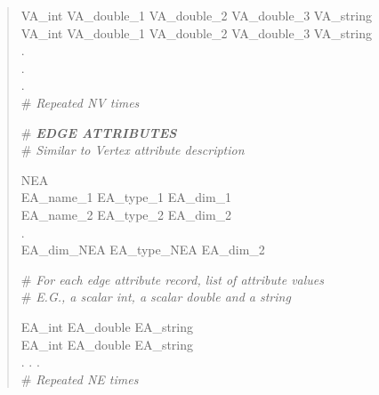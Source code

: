 \documentclass[12pt]{article}
\begin{document}
\begin{verse}
VA\_int \hspace{0.5ex} VA\_double\_1 \hspace{0.5ex} VA\_double\_2 \hspace{0.5ex} VA\_double\_3 \hspace{0.5ex} VA\_string \\
VA\_int \hspace{0.5ex} VA\_double\_1 \hspace{0.5ex} VA\_double\_2 \hspace{0.5ex} VA\_double\_3 \hspace{0.5ex} VA\_string \\
. \\
. \\
. \\
\# \textit{Repeated NV times}
\vspace{2ex}

\newpage
\# \textit{\textbf{EDGE ATTRIBUTES}} \\
\# \textit{Similar to Vertex attribute description}
\vspace{1ex}

NEA \hspace{0.5ex} \\
EA\_name\_1 \hspace{0.5ex} EA\_type\_1 \hspace{0.5ex} EA\_dim\_1 \\ 
EA\_name\_2 \hspace{0.5ex} EA\_type\_2 \hspace{0.5ex} EA\_dim\_2 \\
. \\
EA\_dim\_NEA \hspace{0.5ex} EA\_type\_NEA \hspace{0.5ex} EA\_dim\_2  
\vspace{1ex}

\# \textit{For each edge attribute record, list of attribute values} \\
\# \textit{E.G., a scalar int, a scalar double and a string}
\vspace{1ex}

EA\_int \hspace{0.5ex} EA\_double \hspace{0.5ex} EA\_string \\
EA\_int \hspace{0.5ex} EA\_double \hspace{0.5ex} EA\_string \\
. . . \\
\# \textit{Repeated NE times}
\vspace{2ex}


\end{verse}
\end{document}
